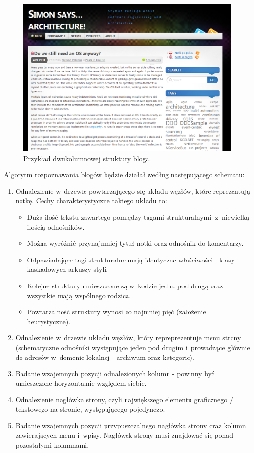 \documentclass[a4paper,10pt]{article}
\begin{document}
\begin{figure}[h!]
\centering
  \includegraphics[width=.9\textwidth]{blog_simon.png}
  \caption{Przykład dwukolumnowej struktury bloga.}
  \label{fig:blog_simon}
\end{figure}

Algorytm rozpoznawania blogów będzie działał według następującego schematu:

\begin{enumerate}
 \item Odnalezienie w~drzewie powtarzającego się układu węzłów, które reprezentują notkę. Cechy charakterystyczne takiego układu to:
    \begin{itemize}
     \item Duża ilość tekstu zawartego pomiędzy tagami strukturalnymi, z~niewielką ilością odnośników.
     \item Można wyróżnić przynajmniej tytuł notki oraz odnośnik do komentarzy.
     \item Odpowiadające tagi strukturalne mają identyczne właściwości - klasy kaskadowych arkuszy styli.
     \item Kolejne struktury umieszczone są w~kodzie jedna pod drugą oraz wszystkie mają wspólnego rodzica.
     \item Powtarzalność struktury wynosi co najmniej pięć (założenie heurystyczne).
    \end{itemize}
  \item Odnalezienie w~drzewie układu węzłów, który repreprezentuje menu strony (schematyczne odnośniki występujące jeden pod drugim i~prowadzące głównie do adresów w~domenie lokalnej - archiwum oraz kategorie).
  \item Badanie wzajemnych pozycji odnalezionych kolumn - powinny być umieszczone horyzontalnie względem siebie.
  \item Odnalezienie nagłówka strony, czyli największego elementu graficznego / tekstowego na stronie, występującego pojedynczo. 
  \item Badanie wzajemnych pozycji przypuszczalnego nagłówka strony oraz kolumn zawierających menu i~wpisy. Nagłówek strony musi znajdować się ponad pozostałymi kolumnami.
\end{enumerate}
\end{document}
